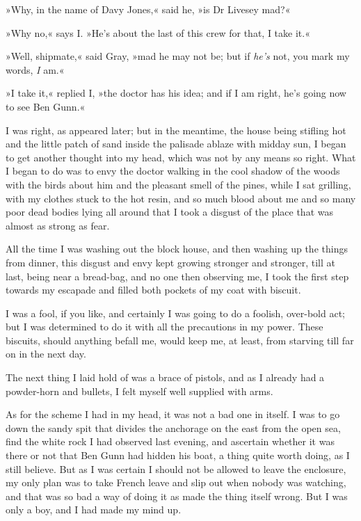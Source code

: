 »Why, in the name of Davy Jones,« said he, »is Dr Livesey mad?«

»Why no,« says I. »He's about the last of this crew for that, I take it.«

»Well, shipmate,« said Gray, »mad he may not be; but if \textit{he's} not, you mark my words, \textit{I} am.«

»I take it,« replied I, »the doctor has his idea; and if I am right, he's going now to see Ben Gunn.«

I was right, as appeared later; but in the meantime, the house being stifling hot and the little patch of sand inside the palisade ablaze with midday sun, I began to get another thought into my head, which was not by any means so right. What I began to do was to envy the doctor walking in the cool shadow of the woods with the birds about him and the pleasant smell of the pines, while I sat grilling, with my clothes stuck to the hot resin, and so much blood about me and so many poor dead bodies lying all around that I took a disgust of the place that was almost as strong as fear.

All the time I was washing out the block house, and then washing up the things from dinner, this disgust and envy kept growing stronger and stronger, till at last, being near a bread-bag, and no one then observing me, I took the first step towards my escapade and filled both pockets of my coat with biscuit.

I was a fool, if you like, and certainly I was going to do a foolish, over-bold act; but I was determined to do it with all the precautions in my power. These biscuits, should anything befall me, would keep me, at least, from starving till far on in the next day.

The next thing I laid hold of was a brace of pistols, and as I already had a powder-horn and bullets, I felt myself well supplied with arms.

As for the scheme I had in my head, it was not a bad one in itself. I was to go down the sandy spit that divides the anchorage on the east from the open sea, find the white rock I had observed last evening, and ascertain whether it was there or not that Ben Gunn had hidden his boat, a thing quite worth doing, as I still believe. But as I was certain I should not be allowed to leave the enclosure, my only plan was to take French leave and slip out when nobody was watching, and that was so bad a way of doing it as made the thing itself wrong. But I was only a boy, and I had made my mind up.

